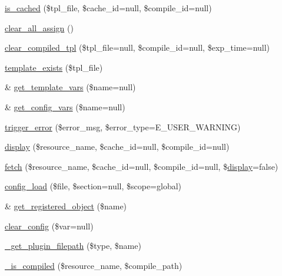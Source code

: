 \begin{DoxyCompactItemize}
\item 
\mbox{\hyperlink{class_smarty_a70d12433755791c1383f394b6a41271d}{is\+\_\+cached}} (\$tpl\+\_\+file, \$cache\+\_\+id=null, \$compile\+\_\+id=null)
\item 
\mbox{\hyperlink{class_smarty_a47a576000a48c74fea66a209d7f0ac21}{clear\+\_\+all\+\_\+assign}} ()
\item 
\mbox{\hyperlink{class_smarty_a71153cdee03c4dcb864488b59442b162}{clear\+\_\+compiled\+\_\+tpl}} (\$tpl\+\_\+file=null, \$compile\+\_\+id=null, \$exp\+\_\+time=null)
\item 
\mbox{\hyperlink{class_smarty_abfade212562dbeff89ccf453c02f5a1b}{template\+\_\+exists}} (\$tpl\+\_\+file)
\item 
\& \mbox{\hyperlink{class_smarty_a0c15a4f13f37eaca8a6e8ed91ad77b23}{get\+\_\+template\+\_\+vars}} (\$name=null)
\item 
\& \mbox{\hyperlink{class_smarty_a2382294d36d8e557c475d66350844bfb}{get\+\_\+config\+\_\+vars}} (\$name=null)
\item 
\mbox{\hyperlink{class_smarty_aa4f8246510406271300bee84f9e1bce3}{trigger\+\_\+error}} (\$error\+\_\+msg, \$error\+\_\+type=E\+\_\+\+U\+S\+E\+R\+\_\+\+W\+A\+R\+N\+I\+NG)
\item 
\mbox{\hyperlink{class_smarty_a7318c22504478672906d321cba2bd713}{display}} (\$resource\+\_\+name, \$cache\+\_\+id=null, \$compile\+\_\+id=null)
\item 
\mbox{\hyperlink{class_smarty_acd45e8177ae9f297026ee9a0732e976c}{fetch}} (\$resource\+\_\+name, \$cache\+\_\+id=null, \$compile\+\_\+id=null, \$\mbox{\hyperlink{class_smarty_a7318c22504478672906d321cba2bd713}{display}}=false)
\item 
\mbox{\hyperlink{class_smarty_af8b4afb25666f433974aedae9dbd5d1e}{config\+\_\+load}} (\$file, \$section=null, \$scope=\textquotesingle{}global\textquotesingle{})
\item 
\& \mbox{\hyperlink{class_smarty_ae922fb129fc263df7c3f4b83880b199d}{get\+\_\+registered\+\_\+object}} (\$name)
\item 
\mbox{\hyperlink{class_smarty_a889e401c09b8d2612e43a50cb2a7dc04}{clear\+\_\+config}} (\$var=null)
\item 
\mbox{\hyperlink{class_smarty_aca3dac6a8fa20f5038e34af0c7f1c78b}{\+\_\+get\+\_\+plugin\+\_\+filepath}} (\$type, \$name)
\item 
\mbox{\hyperlink{class_smarty_a315bf9a64ca2baea77f8868804d847be}{\+\_\+is\+\_\+compiled}} (\$resource\+\_\+name, \$compile\+\_\+path)
\item 

\end{DoxyCompactItemize}
